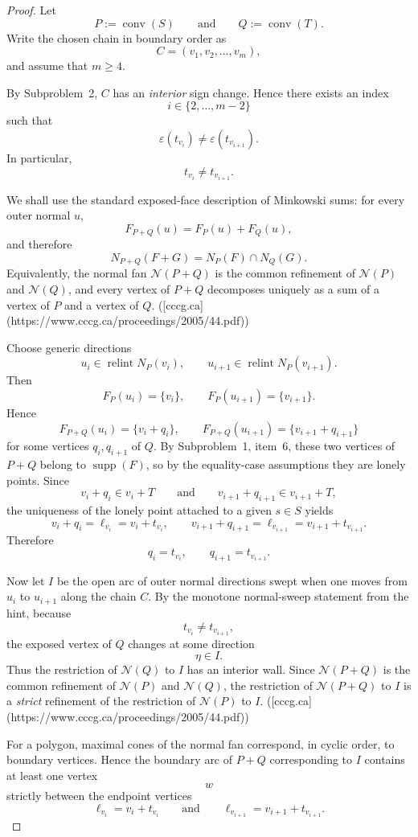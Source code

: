 \begin{proof}
Let
\[
P:=\operatorname{conv}(S)
\qquad\text{and}\qquad
Q:=\operatorname{conv}(T).
\]
Write the chosen chain in boundary order as
\[
C=(v_1,v_2,\dots,v_m),
\]
and assume that \(m\ge 4\).

By Subproblem~2, \(C\) has an \emph{interior} sign change. Hence there exists an index
\[
i\in\{2,\dots,m-2\}
\]
such that
\[
\varepsilon(t_{v_i})\neq \varepsilon(t_{v_{i+1}}).
\]
In particular,
\[
t_{v_i}\neq t_{v_{i+1}}.
\]

We shall use the standard exposed-face description of Minkowski sums: for every outer normal \(u\),
\[
F_{P+Q}(u)=F_P(u)+F_Q(u),
\]
and therefore
\[
N_{P+Q}(F+G)=N_P(F)\cap N_Q(G).
\]
Equivalently, the normal fan \(\mathcal N(P+Q)\) is the common refinement of \(\mathcal N(P)\) and \(\mathcal N(Q)\), and every vertex of \(P+Q\) decomposes uniquely as a sum of a vertex of \(P\) and a vertex of \(Q\). ([cccg.ca](https://www.cccg.ca/proceedings/2005/44.pdf))

Choose generic directions
\[
u_i\in \operatorname{relint}N_P(v_i),
\qquad
u_{i+1}\in \operatorname{relint}N_P(v_{i+1}).
\]
Then
\[
F_P(u_i)=\{v_i\},
\qquad
F_P(u_{i+1})=\{v_{i+1}\}.
\]
Hence
\[
F_{P+Q}(u_i)=\{v_i+q_i\},
\qquad
F_{P+Q}(u_{i+1})=\{v_{i+1}+q_{i+1}\}
\]
for some vertices \(q_i,q_{i+1}\) of \(Q\). By Subproblem~1, item~\(6\), these two vertices of \(P+Q\) belong to \(\operatorname{supp}(F)\), so by the equality-case assumptions they are lonely points. Since
\[
v_i+q_i\in v_i+T
\qquad\text{and}\qquad
v_{i+1}+q_{i+1}\in v_{i+1}+T,
\]
the uniqueness of the lonely point attached to a given \(s\in S\) yields
\[
v_i+q_i=\ell_{v_i}=v_i+t_{v_i},
\qquad
v_{i+1}+q_{i+1}=\ell_{v_{i+1}}=v_{i+1}+t_{v_{i+1}}.
\]
Therefore
\[
q_i=t_{v_i},
\qquad
q_{i+1}=t_{v_{i+1}}.
\]

Now let \(I\) be the open arc of outer normal directions swept when one moves from \(u_i\) to \(u_{i+1}\) along the chain \(C\). By the monotone normal-sweep statement from the hint, because
\[
t_{v_i}\neq t_{v_{i+1}},
\]
the exposed vertex of \(Q\) changes at some direction
\[
\eta\in I.
\]
Thus the restriction of \(\mathcal N(Q)\) to \(I\) has an interior wall. Since \(\mathcal N(P+Q)\) is the common refinement of \(\mathcal N(P)\) and \(\mathcal N(Q)\), the restriction of \(\mathcal N(P+Q)\) to \(I\) is a \emph{strict} refinement of the restriction of \(\mathcal N(P)\) to \(I\). ([cccg.ca](https://www.cccg.ca/proceedings/2005/44.pdf))

For a polygon, maximal cones of the normal fan correspond, in cyclic order, to boundary vertices. Hence the boundary arc of \(P+Q\) corresponding to \(I\) contains at least one vertex
\[
w
\]
strictly between the endpoint vertices
\[
\ell_{v_i}=v_i+t_{v_i}
\qquad\text{and}\qquad
\ell_{v_{i+1}}=v_{i+1}+t_{v_{i+1}}.
\]


\end{proof}
